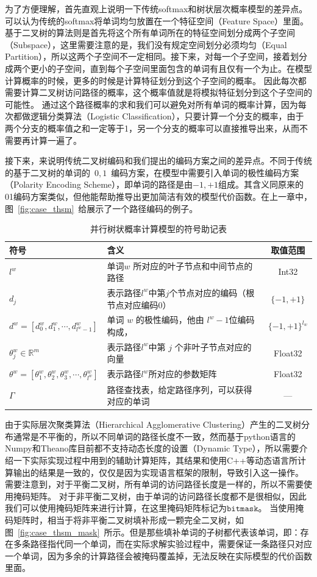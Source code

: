 为了方便理解，首先直观上说明一下传统softmax和树状层次概率模型的差异点。可以认为传统的softmax将单词均匀放置在一个特征空间（Feature Space）里面。基于二叉树的算法则是首先将这个所有单词所在的特征空间划分成两个子空间（Subspace），这里需要注意的是，我们没有规定空间划分必须均匀（Equal Partition），所以这两个子空间不一定相同。接下来，对每一个子空间，接着划分成两个更小的子空间，直到每个子空间里面包含的单词有且仅有一个为止。在模型计算概率的时候，更多的时候是计算特征划分到这个子空间的概率。
因此每次都需要计算二叉树访问路径的概率，这个概率值就是将模拟特征划分到这个子空间的可能性。
通过这个路径概率的求和我们可以避免对所有单词的概率计算，因为每次都做逻辑分类算法（Logistic Classification），只要计算一个分支的概率，由于两个分支的概率值之和一定等于1，另一个分支的概率可以直接推导出来，从而不需要再计算一遍了。


接下来，来说明传统二叉树编码和我们提出的编码方案之间的差异点。不同于传统的基于二叉树的单词的~$0,1$~编码方案，在模型中需要引入单词的极性编码方案（Polarity Encoding Scheme），即单词的路径是由$-1,+1$组成。其含义同原来的01编码方案类似，但他能帮助推导出更加简洁有效的模型代价函数。在上一章中，图~\ref{fig:case_thsm}~给展示了一个路径编码的例子。

\begin{table}[!t]
  \centering
  \caption{并行树状概率计算模型的符号助记表\label{tab:note}}
\begin{tabular}{llc}
  \toprule
   符号&含义&取值范围\\ \midrule
$l^w$ &单词$w$ 所对应的叶子节点和中间节点的路径&Int32 \\
$d_j$&表示路径$l^w$中第$j$个节点对应的编码（根节点对应编码$0$）&$ \{-1,+1\}$\\
$ d^w=[d_0^w,d_1^w,\cdots,d_{l^w-1}^w] $& 单词 $w$ 的极性编码，他由 $l^w-1$位编码构成，&$\{-1,+1\}^{l_w}$\\
$\theta_{j}^w\in\mathbb{R}^m$ &表示路径$l^w$中第 $j$ 个非叶子节点对应的向量& Float32\\
$ \theta^w=[\theta_1^w,\theta_2^w,\theta_3^w, \cdots,\theta_{l^w}^w]$&表示路径$l^w$所对应的参数矩阵&Float32 \\
$\Gamma$ &路径查找表，给定路径序列，可以获得对应的单词& ---\\
  \bottomrule
\end{tabular}
\end{table}

由于实际层次聚类算法（Hierarchical Agglomerative Clustering）产生的二叉树分布通常是不平衡的，所以不同单词的路径长度不一致，然而基于python语言的Numpy和Theano库目前都不支持动态长度的设置（Dynamic Type），所以需要介绍一下实际实现过程中用到的辅助计算矩阵，其结果和使用C++等动态语言所计算输出的结果是一致的，仅仅是因为实现语言框架的限制，导致引入这一操作。
需要注意到，对于平衡二叉树，所有单词的访问路径长度是一样的，所以不需要使用掩码矩阵。
对于非平衡二叉树，由于单词的访问路径长度都不是很相似，因此我们可以使用掩码矩阵来进行计算，在这里掩码矩阵标记为$\mathtt{bitmask}$。
当使用掩码矩阵时，相当于将非平衡二叉树填补形成一颗完全二叉树，如图~\ref{fig:case_thsm_mask}~所示。但是那些填补单词的子树都代表该单词，即：存在多条路径指代同一个单词，而在实际求解实验过程中，需要保证一条路径只对应一个单词，因为多余的计算路径会被掩码覆盖掉，无法反映在实际模型的代价函数里面。


